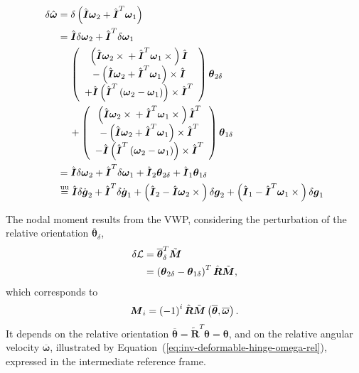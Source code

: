 \documentclass[10pt,dvips,fleqn]{report}
\newcommand{\T}[1]{\boldsymbol{#1}}
\newcommand{\equu}{\overset{\mathrm{uu}}{=}}
\begin{document}
\begin{align}
	\delta\hat{\T{\omega}} &= 
	\delta\plbr{
		\hat{\T{I}} \T{\omega}_2
		+ \hat{\T{I}}^T \T{\omega}_1
	} \\
	&= \hat{\T{I}} \delta\T{\omega}_2
		+ \hat{\T{I}}^T \delta\T{\omega}_1
	\nonumber \\
	&\mbox{\hspace{12pt}}
	\plbr{\cvvect{
		\plbr{
			\hat{\T{I}} \T{\omega}_2 \times{}
			+ \hat{\T{I}}^T \T{\omega}_1 \times{}
		} \hat{\T{I}} \\
		- \plbr{
			\hat{\T{I}} \T{\omega}_2 + \hat{\T{I}}^T \T{\omega}_1
		} \times \hat{\T{I}} \\
		+ \hat{\T{I}} \plbr{
			\hat{\T{I}}^T \plbr{
				\T{\omega}_2 - \T{\omega}_1
			}
		}\times \hat{\T{I}}^T
	}} \T{\theta}_{2\delta} \nonumber \\
	&\mbox{\hspace{12pt}}
	+ \plbr{\cvvect{
		\plbr{
			\hat{\T{I}} \T{\omega}_2 \times{}
			+ \hat{\T{I}}^T \T{\omega}_1 \times{}
		} \hat{\T{I}}^T \\
		- \plbr{
			\hat{\T{I}} \T{\omega}_2 + \hat{\T{I}}^T \T{\omega}_1
		} \times \hat{\T{I}}^T \\
		- \hat{\T{I}} \plbr{
			\hat{\T{I}}^T \plbr{
				\T{\omega}_2 - \T{\omega}_1
			}
		}\times \hat{\T{I}}^T
	}} \T{\theta}_{1\delta} \\
	&= \hat{\T{I}} \delta\T{\omega}_2
		+ \hat{\T{I}}^T \delta\T{\omega}_1
	+ \hat{\T{I}}_2 \T{\theta}_{2\delta}
	+ \hat{\T{I}}_1 \T{\theta}_{1\delta} \\
	&\equu
	\hat{\T{I}} \delta\dot{\T{g}}_2
		+ \hat{\T{I}}^T \delta\dot{\T{g}}_1
	+ \plbr{\hat{\T{I}}_2 - \hat{\T{I}} \T{\omega}_2\times{}}
		\delta\T{g}_2
	+ \plbr{\hat{\T{I}}_1 - \hat{\T{I}}^T \T{\omega}_1\times{}}
		\delta\T{g}_1
\end{align}




The nodal moment results from the VWP, considering the perturbation 
of the relative orientation $\overline{\T{\theta}}_{\delta}$,
\begin{align}
	\delta\mathcal{L}
	& = \overline{\T{\theta}}_{\delta}^T \tilde{\T{M}} \\
	&= \plbr{
		\T{\theta}_{2\delta} - \T{\theta}_{1\delta}
	}^T \hat{\T{R}} \tilde{\T{M}} ,
\end{align}
which corresponds to
\begin{equation}
	\T{M}_i = \plbr{-1}^i \hat{\T{R}}
		\tilde{\T{M}}\plbr{\overline{\T{\theta}}, \overline{\T{\omega}}} .
\end{equation}
It depends on the relative orientation 
$\overline{\T{\theta}}=\tilde{\T{R}}^T\T{\theta}=\T{\theta}$,
and on the relative angular velocity $\overline{\T{\omega}}$,
illustrated by Equation~(\ref{eq:inv-deformable-hinge-omega-rel}),
expressed in the intermediate reference frame.
\end{document}
